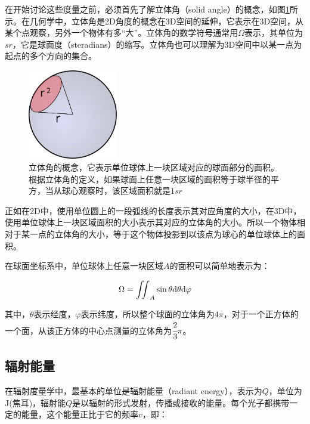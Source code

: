 在开始讨论这些度量之前，必须首先了解立体角（solid angle）的概念，如图\ref{f:intro-solid-angle}所示。在几何学中，立体角是2D角度的概念在3D空间的延伸，它表示在3D空间，从某个点观察，另外一个物体有多“大”。立体角的数学符号通常用$\Omega$表示，其单位为$sr$，它是球面度（steradians）的缩写。立体角也可以理解为3D空间中以某一点为起点的多个方向的集合。

\begin{figure}
\sidecaption
	\includegraphics[width=0.35\textwidth]{figures/intro/solid-angle}
	\caption{立体角的概念，它表示单位球体上一块区域对应的球面部分的面积。根据立体角的定义，如果球面上任意一块区域的面积等于球半径的平方，当从球心观察时，该区域面积就是$1sr$}
	\label{f:intro-solid-angle}
\end{figure}

正如在2D中，使用单位圆上的一段弧线的长度表示其对应角度的大小，在3D中，使用单位球体上一块区域面积的大小表示其对应的立体角的大小。所以一个物体相对于某一点的立体角的大小，等于这个物体投影到以该点为球心的单位球体上的面积。

在球面坐标系中，单位球体上任意一块区域$A$的面积可以简单地表示为：

\begin{equation}
	\Omega= {\rm \iint}_A \sin\theta {\rm d}\theta {\rm d}\varphi
\end{equation}

\noindent 其中，$\theta$表示经度，$\varphi$表示纬度，所以整个球面的立体角为$4\pi$，对于一个正方体的一个面，从该正方体的中心点测量的立体角为$ \cfrac{2}{3}\pi$。



\subsection{辐射能量}
在辐射度量学中，最基本的单位是辐射能量（radiant energy），表示为$Q$，单位为J(焦耳)，辐射能$Q$是以辐射的形式发射，传播或接收的能量。每个光子都携带一定的能量，这个能量正比于它的频率$v$，即：

